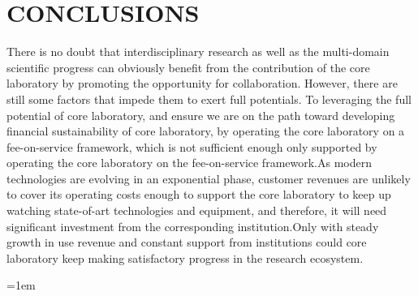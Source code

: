 \documentclass[12pt]{article}
\begin{document}
\section{CONCLUSIONS}
There is no doubt that interdisciplinary research as well as the multi-domain scientific progress can obviously benefit from the contribution of the core laboratory by promoting the opportunity for collaboration. However, there are still some factors that impede them to exert full potentials. To leveraging the full potential of core laboratory, and ensure we are on the path toward developing financial sustainability of core laboratory, by operating the core laboratory on a fee-on-service framework, which is not sufficient enough only supported by operating the core laboratory on the fee-on-service framework.As modern technologies are evolving in an exponential phase, customer revenues are unlikely to cover its operating costs
enough to support the core laboratory to keep up watching state-of-art technologies and equipment, and therefore, it will need significant investment from the corresponding institution.Only with steady growth in use revenue and constant support from institutions could core laboratory keep making satisfactory progress in the research ecosystem.


\emergencystretch=1em
\printbibliography[title=Reference]
\end{document}

